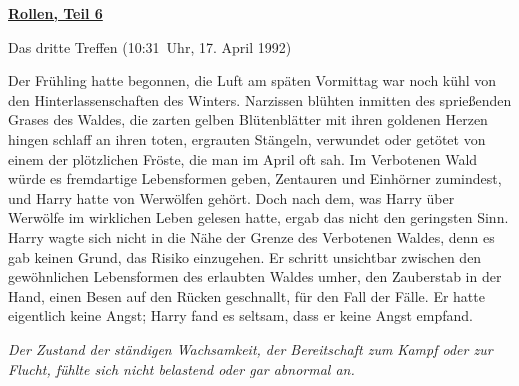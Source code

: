 

\hypertarget{rollen-teil-6}{%

\textbf{\uline{Rollen, Teil 6}}

Das dritte Treffen (10:31~Uhr, 17. April 1992)

Der Frühling hatte begonnen, die Luft am späten Vormittag war noch kühl von den Hinterlassenschaften des Winters. Narzissen blühten inmitten des sprießenden Grases des Waldes, die zarten gelben Blütenblätter mit ihren goldenen Herzen hingen schlaff an ihren toten, ergrauten Stängeln, verwundet oder getötet von einem der plötzlichen Fröste, die man im April oft sah. Im Verbotenen Wald würde es fremdartige Lebensformen geben, Zentauren und Einhörner zumindest, und Harry hatte von Werwölfen gehört. Doch nach dem, was Harry über Werwölfe im wirklichen Leben gelesen hatte, ergab das nicht den geringsten Sinn. Harry wagte sich nicht in die Nähe der Grenze des Verbotenen Waldes, denn es gab keinen Grund, das Risiko einzugehen. Er schritt unsichtbar zwischen den gewöhnlichen Lebensformen des erlaubten Waldes umher, den Zauberstab in der Hand, einen Besen auf den Rücken geschnallt, für den Fall der Fälle. Er hatte eigentlich keine Angst; Harry fand es seltsam, dass er keine Angst empfand.

\emph{Der Zustand der ständigen Wachsamkeit, der Bereitschaft zum Kampf oder zur Flucht, fühlte sich nicht belastend oder gar abnormal an.}

}
